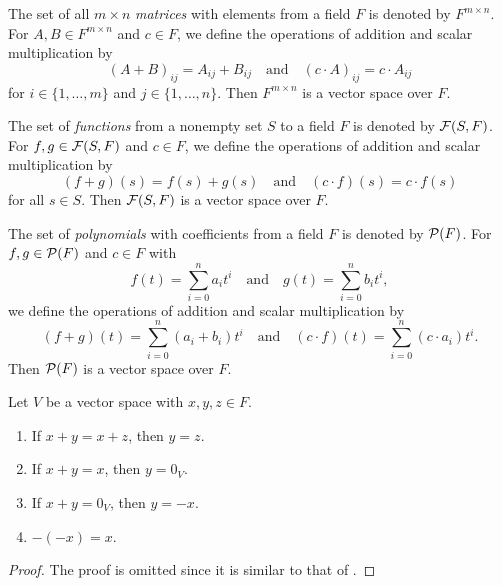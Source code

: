 \begin{example}
  The set of all $m \times n$ \emph{matrices} with elements from a field $F$ is
  denoted by $F^{m \times n}$.
  For $A, B \in F^{m \times n}$ and $c \in F$, we define the operations of
  addition and scalar multiplication by
  \begin{equation*}
    (A + B)_{ij} = A_{ij} + B_{ij}
    \quad \text{and} \quad
    (c \cdot A)_{ij} = c \cdot A_{ij}
  \end{equation*}
  for $i \in \{1, \dots, m\}$ and $j \in \{1, \dots, n\}$.
  Then $F^{m \times n}$ is a vector space over $F$.
\end{example}

\begin{example}
  The set of \emph{functions} from a nonempty set $S$ to a field $F$ is denoted
  by $\mathcal{F}(S, F)$.
  For $f, g \in \mathcal{F}(S, F)$ and $c \in F$, we define the operations of
  addition and scalar multiplication by
  \begin{equation*}
    (f + g)(s) = f(s) + g(s)
    \quad \text{and} \quad
    (c \cdot f)(s) = c \cdot f(s)
  \end{equation*}
  for all $s \in S$.
  Then $\mathcal{F}(S, F)$ is a vector space over $F$.
\end{example}

\begin{example}
  The set of \emph{polynomials} with coefficients from a field $F$ is denoted
  by $\mathcal{P}(F)$.
  For $f, g \in \mathcal{P}(F)$ and $c \in F$ with
  \begin{equation*}
    f(t) = \sum_{i=0}^n a_it^i
    \quad \text{and} \quad
    g(t) = \sum_{i=0}^n b_it^i,
  \end{equation*}
  we define the operations of addition and scalar multiplication by
  \begin{equation*}
    (f + g)(t) = \sum_{i=0}^n (a_i + b_i)t^i
    \quad \text{and} \quad
    (c \cdot f)(t) = \sum_{i=0}^n (c \cdot a_i)t^i.
  \end{equation*}
  Then $\mathcal{P}(F)$ is a vector space over $F$.
\end{example}

\begin{proposition}\label{prop:vector-space-addition}
  Let $V$ be a vector space with $x, y, z \in F$.
  \begin{enumerate}
    \item If $x + y = x + z$, then $y = z$.
    \item If $x + y = x$, then $y = 0_V$.
    \item If $x + y = 0_V$, then $y = -x$.
    \item $-(-x) = x$.
  \end{enumerate}
\end{proposition}
\begin{proof}
  The proof is omitted since it is similar to that of
  .
\end{proof}


